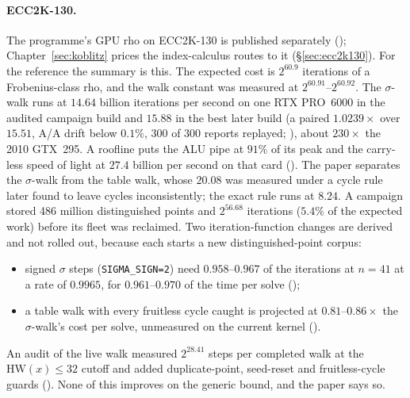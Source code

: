 \paragraph{ECC2K-130.} The programme's GPU rho on ECC2K-130 is published
separately (); Chapter~\ref{sec:koblitz} prices the
index-calculus routes to it (\S\ref{sec:ecc2k130}). For the reference the
summary is this. The expected cost is $2^{60.9}$ iterations of a
Frobenius-class rho, and the walk constant was measured at
$2^{60.91}$--$2^{60.92}$. The $\sigma$-walk runs at $14.64$ billion
iterations per second on one RTX PRO~6000 in the audited campaign build
and $15.88$ in the best later build (a paired $1.0239\times$ over $15.51$,
A/A drift below $0.1\%$, 300 of 300 reports replayed;
), about $230\times$ the 2010 GTX~295. A roofline
puts the ALU pipe at $91\%$ of its peak and the carry-less speed of light at
$27.4$ billion per second on that card (). The
paper separates the $\sigma$-walk from the table walk, whose $20.08$ was
measured under a cycle rule later found to leave cycles inconsistently;
the exact rule runs at $8.24$. A campaign stored 486 million distinguished
points and $2^{56.68}$ iterations ($5.4\%$ of the expected work) before its
fleet was reclaimed. Two iteration-function changes are derived and not
rolled out, because each starts a new distinguished-point corpus:
\begin{itemize}
\item signed $\sigma$ steps (\texttt{SIGMA\_SIGN=2}) need $0.958$--$0.967$ of
  the iterations at $n=41$ at a rate of $0.9965$, for $0.961$--$0.970$ of the
  time per solve ();
\item a table walk with every fruitless cycle caught is projected at
  $0.81$--$0.86\times$ the $\sigma$-walk's cost per solve, unmeasured on the
  current kernel ().
\end{itemize}
An audit of the live walk measured $2^{28.41}$ steps per completed walk at
the $\mathrm{HW}(x)\le32$ cutoff and added duplicate-point, seed-reset and
fruitless-cycle guards ().
None of this improves on the generic bound, and the paper says so.

